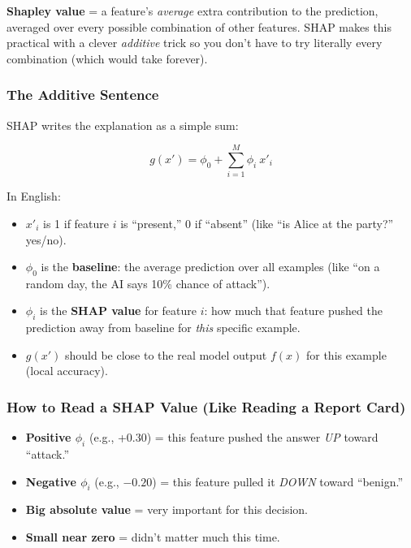 \documentclass[11pt,a4paper]{article}
\begin{document}
\begin{keybox}
\textbf{Shapley value} = a feature's \emph{average} extra contribution to the
prediction, averaged over every possible combination of other features. SHAP
makes this practical with a clever \emph{additive} trick so you don't have to
try literally every combination (which would take forever).
\end{keybox}

\subsubsection{The Additive Sentence}

SHAP writes the explanation as a simple sum:

\[
g(x') = \phi_0 + \sum_{i=1}^{M} \phi_i \ x'_i
\]

In English:

\begin{itemize}[leftmargin=1.6em,itemsep=2pt]
  \item $x'_i$ is 1 if feature $i$ is ``present,'' 0 if ``absent'' (like
        ``is Alice at the party?'' yes/no).
  \item $\phi_0$ is the \textbf{baseline}: the average prediction over all
examples (like ``on a random day, the AI says 10\% chance of attack'').
  \item $\phi_i$ is the \textbf{SHAP value} for feature $i$: how much that
feature pushed the prediction away from baseline for \emph{this}
specific example.
  \item $g(x')$ should be close to the real model output $f(x)$ for this
example (local accuracy).
\end{itemize}

\subsubsection{How to Read a SHAP Value (Like Reading a Report Card)}

\begin{itemize}[leftmargin=1.6em,itemsep=2pt]
  \item \textbf{Positive $\phi_i$} (e.g., +0.30) = this feature pushed the
answer \emph{UP} toward ``attack.''
  \item \textbf{Negative $\phi_i$} (e.g., $-0.20$) = this feature pulled it
\emph{DOWN} toward ``benign.''
  \item \textbf{Big absolute value} = very important for this decision.
  \item \textbf{Small near zero} = didn't matter much this time.
\end{itemize}
\end{document}
